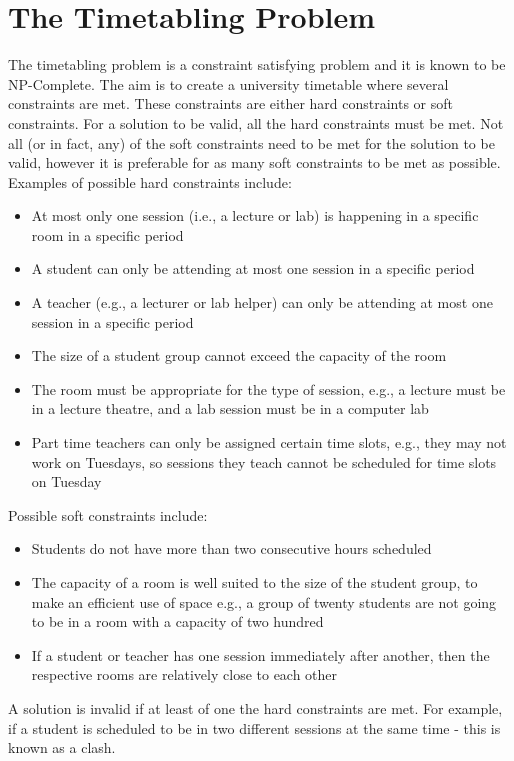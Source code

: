 \documentclass[a4paper, 12pt]{report}
\begin{document}
\section{The Timetabling Problem}
The timetabling problem is a constraint satisfying problem and it is known to
be NP-Complete. The aim is to create a university timetable where several
constraints are met. These constraints are either hard constraints or soft
constraints. For a solution to be valid, all the hard constraints must be met.
Not all (or in fact, any) of the soft constraints need to be met for the
solution to be valid, however it is preferable for as many soft constraints to
be met as possible. Examples of possible hard constraints include:
\begin{itemize}
    \item At most only one session (i.e., a lecture or lab) is happening in a specific
          room in a specific period
    \item A student can only be attending at most one session in a specific period
    \item A teacher (e.g., a lecturer or lab helper) can only be attending at most one
          session in a specific period
    \item The size of a student group cannot exceed the capacity of the room
    \item The room must be appropriate for the type of session, e.g., a lecture must be
          in a lecture theatre, and a lab session must be in a computer lab
    \item Part time teachers can only be assigned certain time slots, e.g., they may not
          work on Tuesdays, so sessions they teach cannot be scheduled for time slots on
          Tuesday
\end{itemize}
Possible soft constraints include:
\begin{itemize}
    \item Students do not have more than two consecutive hours scheduled
    \item The capacity of a room is well suited to the size of the student group, to make
          an efficient use of space e.g., a group of twenty students are not going to be
          in a room with a capacity of two hundred
    \item If a student or teacher has one session immediately after another, then the
          respective rooms are relatively close to each other
\end{itemize}
A solution is invalid if at least of one the hard constraints are met. For example, if a student is scheduled to be in two different sessions at the same time - this is known as a clash.
\end{document}
